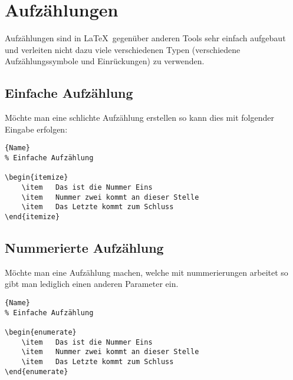 \section{Aufzählungen}

\noindent
Aufzählungen sind in \LaTeX~gegenüber anderen Tools sehr
einfach aufgebaut und verleiten nicht dazu viele
verschiedenen Typen (verschiedene Aufzählungssymbole und
Einrückungen) zu verwenden. 

\subsection{Einfache Aufzählung}

\noindent
Möchte man eine schlichte Aufzählung erstellen so kann dies
mit folgender Eingabe erfolgen:


\begin{lstlisting}[caption=Einfache Aufzählung,
                   label={lst:simplelist}]{Name}
% Einfache Aufzählung

\begin{itemize}
    \item   Das ist die Nummer Eins
    \item   Nummer zwei kommt an dieser Stelle
    \item   Das Letzte kommt zum Schluss
\end{itemize}
\end{lstlisting}


\subsection{Nummerierte Aufzählung}

\noindent
Möchte man eine Aufzählung machen, welche mit
nummerierungen arbeitet so gibt man lediglich einen anderen
Parameter ein.

\begin{lstlisting}[caption=Nummerierte Aufzählung,
                   label={lst:simplelist}]{Name}
% Einfache Aufzählung

\begin{enumerate}
    \item   Das ist die Nummer Eins
    \item   Nummer zwei kommt an dieser Stelle
    \item   Das Letzte kommt zum Schluss
\end{enumerate}
\end{lstlisting}

